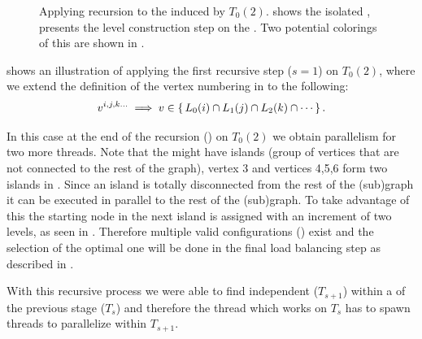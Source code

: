 \begin{figure}[t]
	     \hspace{1.75em}
     	\caption{Applying recursion to the \subgraph induced by $T_0(2)$.  shows the isolated \subgraph,  presents the level construction step on the \subgraph. Two potential \DONE colorings of this  \subgraph are shown in .}
     	
     	\label{fig:rec_d1_s2}
     \end{figure}
     
      shows an illustration of applying the first recursive step ($s=1$) on $T_0(2)$, where we extend the definition of the vertex numbering in  to the following:
	 \begin{equation}
	    v^{i,j,k...} \implies v \in \set{L_0(i) \cap L_1(j) \cap L_2(k) \cap \cdots}.
	 \end{equation}
	 
     In this case at the end of the recursion (\cf {}) on $T_0(2)$ we obtain parallelism for two more threads. Note that the \subgraphs might have islands (group of vertices that are not connected to the rest of the graph), \eg vertex 3 and vertices 4,5,6 form two islands in . Since an island is totally disconnected from the rest of the (sub)graph it can be executed in parallel to the rest of the (sub)graph. To take advantage of this the starting node in the next island is assigned with an increment of two levels, as seen in . Therefore multiple valid \DONE configurations (\cf {}) exist and the selection of the optimal one will be done in the final load balancing step as described in .    
     
     With this recursive process we were able to find independent \levelGroups ($T_{s+1}$) within a \levelGroup of the previous stage ($T_s$) and therefore the thread which works on $T_s$ has to spawn threads to parallelize within $T_{s+1}$.
     
